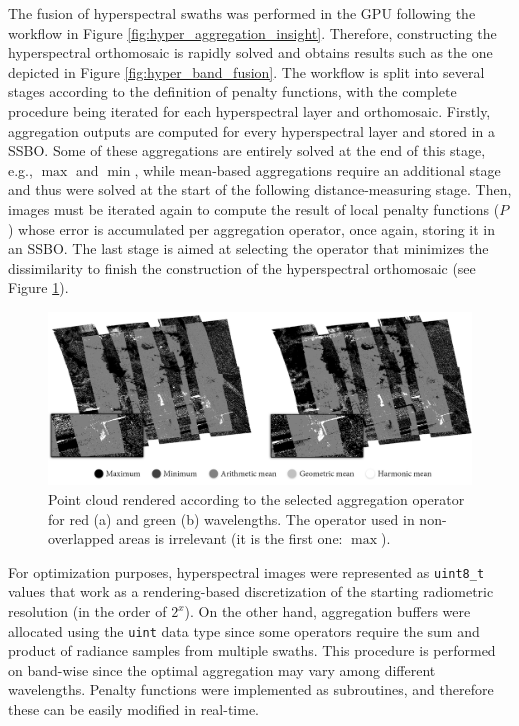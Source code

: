 The fusion of hyperspectral swaths was performed in the GPU following the workflow in Figure \ref{fig:hyper_aggregation_insight}. Therefore, constructing the hyperspectral orthomosaic is rapidly solved and obtains results such as the one depicted in Figure \ref{fig:hyper_band_fusion}. The workflow is split into several stages according to the definition of penalty functions, with the complete procedure being iterated for each hyperspectral layer and orthomosaic. Firstly, aggregation outputs are computed for every hyperspectral layer and stored in a SSBO. Some of these aggregations are entirely solved at the end of this stage, e.g., $\max$ and $\min$, while mean-based aggregations require an additional stage and thus were solved at the start of the following distance-measuring stage. Then, images must be iterated again to compute the result of local penalty functions ($P$) whose error is accumulated per aggregation operator, once again, storing it in an SSBO. The last stage is aimed at selecting the operator that minimizes the dissimilarity to finish the construction of the hyperspectral orthomosaic (see Figure \ref{fig:hyper_aggregation_selection}). 

\begin{figure}[bt]
    \centering
    \includegraphics[width=\linewidth]{figs/hyper_point_cloud/aggregation_selection.png}
	\caption{Point cloud rendered according to the selected aggregation operator for red (a) and green (b) wavelengths. The operator used in non-overlapped areas is irrelevant (it is the first one: $\max$).  }
	\label{fig:hyper_aggregation_selection}
\end{figure}

For optimization purposes, hyperspectral images were represented as \verb|uint8_t| values that work as a rendering-based discretization of the starting radiometric resolution (in the order of $2^x$). On the other hand, aggregation buffers were allocated using the \verb|uint| data type since some operators require the sum and product of radiance samples from multiple swaths. This procedure is performed on band-wise since the optimal aggregation may vary among different wavelengths. Penalty functions were implemented as subroutines, and therefore these can be easily modified in real-time.


